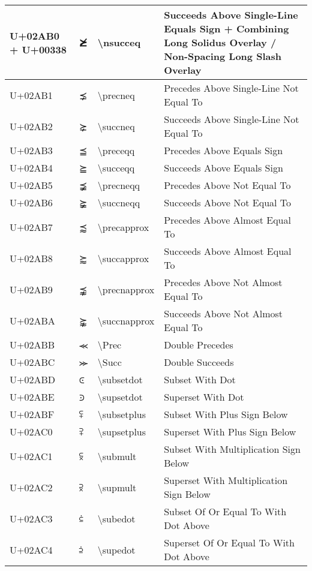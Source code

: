 \begin{table}[h]
\begin{tabulary}{\linewidth}{|L|L|L|L|}
\hline
U+02AB0 + U+00338 & ⪰̸ & {\textbackslash}nsucceq & Succeeds Above Single-Line Equals Sign + Combining Long Solidus Overlay / Non-Spacing Long Slash Overlay \\
\hline
U+02AB1 & ⪱ & {\textbackslash}precneq & Precedes Above Single-Line Not Equal To \\
\hline
U+02AB2 & ⪲ & {\textbackslash}succneq & Succeeds Above Single-Line Not Equal To \\
\hline
U+02AB3 & ⪳ & {\textbackslash}preceqq & Precedes Above Equals Sign \\
\hline
U+02AB4 & ⪴ & {\textbackslash}succeqq & Succeeds Above Equals Sign \\
\hline
U+02AB5 & ⪵ & {\textbackslash}precneqq & Precedes Above Not Equal To \\
\hline
U+02AB6 & ⪶ & {\textbackslash}succneqq & Succeeds Above Not Equal To \\
\hline
U+02AB7 & ⪷ & {\textbackslash}precapprox & Precedes Above Almost Equal To \\
\hline
U+02AB8 & ⪸ & {\textbackslash}succapprox & Succeeds Above Almost Equal To \\
\hline
U+02AB9 & ⪹ & {\textbackslash}precnapprox & Precedes Above Not Almost Equal To \\
\hline
U+02ABA & ⪺ & {\textbackslash}succnapprox & Succeeds Above Not Almost Equal To \\
\hline
U+02ABB & ⪻ & {\textbackslash}Prec & Double Precedes \\
\hline
U+02ABC & ⪼ & {\textbackslash}Succ & Double Succeeds \\
\hline
U+02ABD & ⪽ & {\textbackslash}subsetdot & Subset With Dot \\
\hline
U+02ABE & ⪾ & {\textbackslash}supsetdot & Superset With Dot \\
\hline
U+02ABF & ⪿ & {\textbackslash}subsetplus & Subset With Plus Sign Below \\
\hline
U+02AC0 & ⫀ & {\textbackslash}supsetplus & Superset With Plus Sign Below \\
\hline
U+02AC1 & ⫁ & {\textbackslash}submult & Subset With Multiplication Sign Below \\
\hline
U+02AC2 & ⫂ & {\textbackslash}supmult & Superset With Multiplication Sign Below \\
\hline
U+02AC3 & ⫃ & {\textbackslash}subedot & Subset Of Or Equal To With Dot Above \\
\hline
U+02AC4 & ⫄ & {\textbackslash}supedot & Superset Of Or Equal To With Dot Above \\

\end{tabulary}
\end{table}
